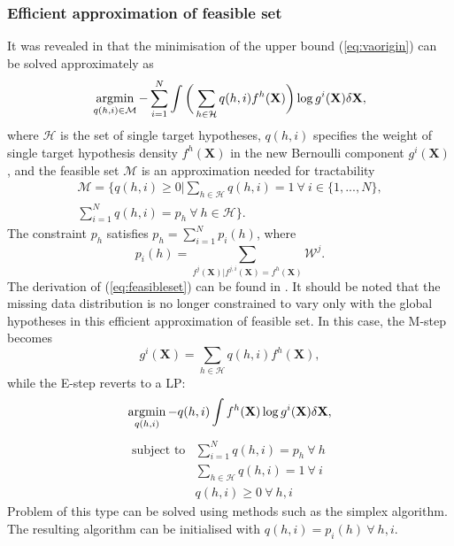 \documentclass[conference]{IEEEtran}
\begin{document}
\subsubsection{Efficient approximation of feasible set}
It was revealed in \cite{variational} that the minimisation of the upper bound (\ref{eq:vaorigin}) can be solved approximately as
\begin{equation}
\operatornamewithlimits{argmin}_{q(h,i)\in\mathcal{M}}-\sum_{i=1}^N\int\bigg(\sum_{h\in\mathcal{H}}q(h,i)f^h(\mathbf{X})\bigg)\log g^i(\mathbf{X})\delta\mathbf{X},
\label{eq:feasibleset}
\end{equation}
where $\mathcal{H}$ is the set of single target hypotheses, $q(h,i)$ specifies the weight of single target hypothesis density $f^h(\mathbf{X})$ in the new Bernoulli component $g^i(\mathbf{X})$, and the feasible set $\mathcal{M}$ is an approximation needed for tractability
\begin{multline}
    \mathcal{M} = \Bigg\{q(h,i)\geq0\Bigg|\sum_{h\in\mathcal{H}}q(h,i)=1 ~\forall~ i\in\{1,...,N\},\\\sum_{i=1}^Nq(h,i)=p_h ~\forall~ h\in\mathcal{H}\Bigg\}.
    \label{eq:polytope}
\end{multline}
The constraint $p_h$ satisfies $p_h=\sum_{i=1}^Np_i(h)$, where
\begin{equation}
p_i(h) = \sum\limits_{f^j(\mathbf{X})|f^{j,i}(\mathbf{X})=f^h(\mathbf{X})}\mathcal{W}^j.
\label{eq:marginalprob}
\end{equation}
The derivation of (\ref{eq:feasibleset}) can be found in \cite{variational}. It should be noted that the missing data distribution is no longer constrained to vary only with the global hypotheses in this efficient approximation of feasible set. In this case, the M-step becomes
\begin{equation}
g^i(\mathbf{X}) = \sum_{h\in\mathcal{H}}q(h,i)f^h(\mathbf{X}),
\end{equation}
while the E-step reverts to a LP:
\begin{equation}
\operatornamewithlimits{argmin}_{q(h,i)}-q(h,i)\int f^h(\mathbf{X})\log g^{i}(\mathbf{X})\delta \mathbf{X},
\label{eq:esteplp}
\end{equation}
\begin{align*}
    \text{subject to} &\sum_{i=1}^Nq(h,i) = p_h~\forall~h~\\
    &\sum_{h\in\mathcal{H}}q(h,i) = 1~\forall~i\\
    &q(h,i) \geq 0~\forall~h,i
\end{align*}
Problem of this type can be solved using methods such as the simplex algorithm. The resulting algorithm can be initialised with $q(h,i)=p_i(h)~\forall~h,i$.
\end{document}
